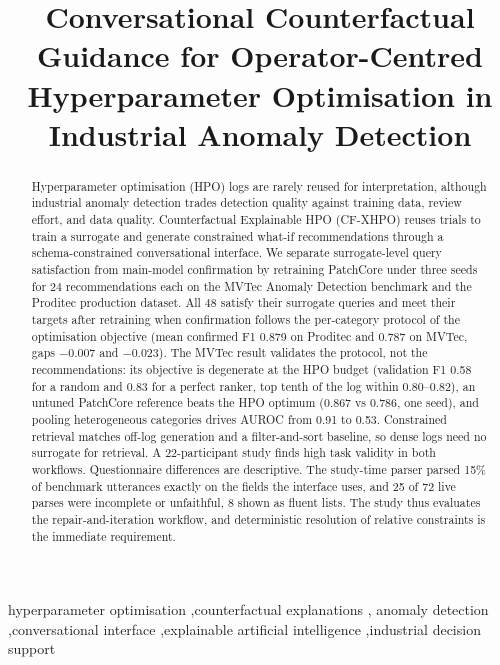 \documentclass[final,5p,times,twocolumn]{elsarticle}
\begin{document}
\begin{frontmatter}

\title{Conversational Counterfactual Guidance for Operator-Centred
Hyperparameter Optimisation in Industrial Anomaly Detection}


\begin{abstract}
Hyperparameter optimisation (HPO) logs are rarely reused for interpretation, although industrial anomaly detection trades detection quality against training data, review effort, and data quality. Counterfactual Explainable HPO (CF-XHPO) reuses trials to train a surrogate and generate constrained what-if recommendations through a schema-constrained conversational interface. We separate surrogate-level query satisfaction from main-model confirmation by retraining PatchCore under three seeds for 24 recommendations each on the MVTec Anomaly Detection benchmark and the Proditec production dataset. All 48 satisfy their surrogate queries and meet their targets after retraining when confirmation follows the per-category
protocol of the optimisation objective (mean confirmed F1 0.879 on Proditec and 0.787 on MVTec, gaps $-0.007$ and $-0.023$). The MVTec result validates the protocol, not the recommendations: its objective is degenerate at the HPO budget (validation F1 0.58 for a random and 0.83 for a perfect ranker, top tenth of the log within 0.80--0.82), an untuned PatchCore reference beats the HPO optimum (0.867 vs 0.786, one seed), and pooling heterogeneous categories drives AUROC from 0.91 to 0.53.
Constrained retrieval matches off-log generation and a filter-and-sort
baseline, so dense logs need no surrogate for retrieval. A 22-participant study finds high task validity in both workflows. Questionnaire differences are descriptive. The study-time parser parsed 15\% of benchmark utterances exactly on the fields the interface uses, and 25 of 72 live parses were incomplete or unfaithful, 8 shown as fluent lists. The study thus evaluates the repair-and-iteration workflow, and deterministic resolution of relative constraints is the immediate requirement.
\end{abstract}

\begin{keyword}
hyperparameter optimisation \sep counterfactual explanations \sep
anomaly detection \sep conversational interface \sep explainable artificial intelligence
\sep industrial decision support
\end{keyword}

\end{frontmatter}
\end{document}
